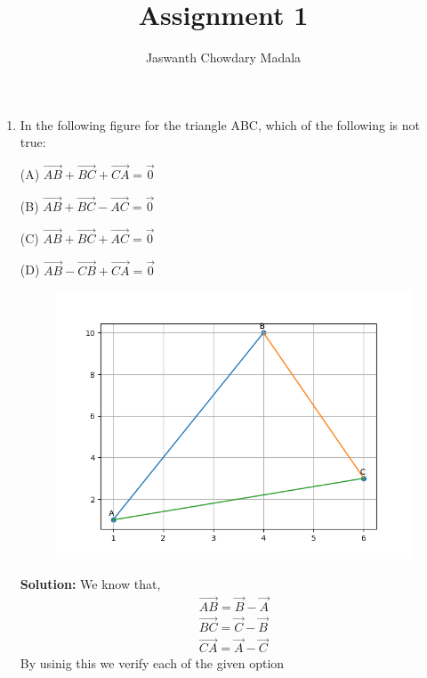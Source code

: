 \documentclass[journal,12pt,twocolumn]{IEEEtran}
\begin{document}
\vspace{3cm}


\title{Assignment 1}
\author{Jaswanth Chowdary Madala}





\maketitle

\newpage


\bigskip

\renewcommand{\thefigure}{\theenumi}
\renewcommand{\thetable}{\theenumi}

\begin{enumerate}
\item In the following figure for the triangle ABC, which of the following is not true:

(A) $\overrightarrow{AB}+\overrightarrow{BC}+\overrightarrow{CA} = \overrightarrow{0}$

(B) $\overrightarrow{AB}+\overrightarrow{BC}-\overrightarrow{AC} = \overrightarrow{0}$

(C) $\overrightarrow{AB}+\overrightarrow{BC}+\overrightarrow{AC} = \overrightarrow{0}$

(D) $\overrightarrow{AB}-\overrightarrow{CB}+\overrightarrow{CA} = \overrightarrow{0}$

\begin{figure}[h]
\centering
\includegraphics[width = \columnwidth]{./figs/triangle.png}
\caption{}
\end{figure}
\textbf{Solution:} We know that,
\begin{align}
\overrightarrow{AB} = \vec{B} - \vec{A}\\
\overrightarrow{BC} = \vec{C} - \vec{B}\\
\overrightarrow{CA} = \vec{A} - \vec{C}
\end{align}
By usinig this we verify each of the given option


\end{enumerate}
\end{document}

